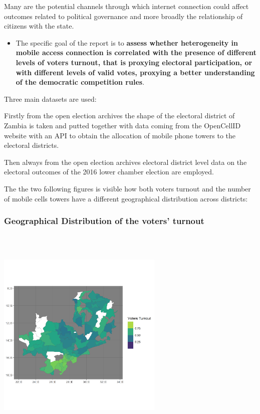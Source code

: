 \documentclass[
]{article}
\providecommand{\tightlist}{%
  \setlength{\itemsep}{0pt}\setlength{\parskip}{0pt}}
\begin{document}
Many are the potential channels through which internet connection could
affect outcomes related to political governance and more broadly the
relationship of citizens with the state.

\begin{itemize}
\tightlist
\item
  The specific goal of the report is to \textbf{assess whether
  heterogeneity in mobile access connection is correlated with the
  presence of different levels of voters turnout, that is proxying
  electoral participation, or with different levels of valid votes,
  proxying a better understanding of the democratic competition rules}.
\end{itemize}

Three main datasets are used:

Firstly from the open election archives the shape of the electoral
district of Zambia is taken and putted together with data coming from
the OpenCellID website with an API to obtain the allocation of mobile
phone towers to the electoral districts.

Then always from the open election archives electoral district level
data on the electoral outcomes of the 2016 lower chamber election are
employed.

The the two following figures is visible how both voters turnout and the
number of mobile cells towers have a different geographical distribution
across districts:

\hypertarget{geographical-distribution-of-the-voters-turnout}{%
\subsubsection{Geographical Distribution of the voters'
turnout}\label{geographical-distribution-of-the-voters-turnout}}

\includegraphics[width=3.125in,height=4.16667in]{outcome1.png}
\end{document}

